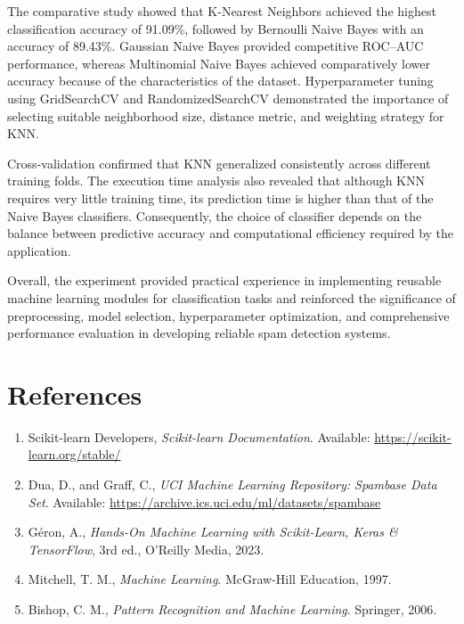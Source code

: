 \documentclass[12pt,a4paper]{article}
\begin{document}
	The comparative study showed that K-Nearest Neighbors achieved the highest classification accuracy of 91.09\%, followed by Bernoulli Naive Bayes with an accuracy of 89.43\%. Gaussian Naive Bayes provided competitive ROC--AUC performance, whereas Multinomial Naive Bayes achieved comparatively lower accuracy because of the characteristics of the dataset. Hyperparameter tuning using GridSearchCV and RandomizedSearchCV demonstrated the importance of selecting suitable neighborhood size, distance metric, and weighting strategy for KNN.
	
	Cross-validation confirmed that KNN generalized consistently across different training folds. The execution time analysis also revealed that although KNN requires very little training time, its prediction time is higher than that of the Naive Bayes classifiers. Consequently, the choice of classifier depends on the balance between predictive accuracy and computational efficiency required by the application.
	
	Overall, the experiment provided practical experience in implementing reusable machine learning modules for classification tasks and reinforced the significance of preprocessing, model selection, hyperparameter optimization, and comprehensive performance evaluation in developing reliable spam detection systems.
	
	\section{References}
	
	\begin{enumerate}
		
		\item Scikit-learn Developers, \emph{Scikit-learn Documentation}. Available: \url{https://scikit-learn.org/stable/}
		
		\item Dua, D., and Graff, C., \emph{UCI Machine Learning Repository: Spambase Data Set}. Available: \url{https://archive.ics.uci.edu/ml/datasets/spambase}
		
		\item Géron, A., \emph{Hands-On Machine Learning with Scikit-Learn, Keras \& TensorFlow}, 3rd ed., O'Reilly Media, 2023.
		
		\item Mitchell, T. M., \emph{Machine Learning}. McGraw-Hill Education, 1997.
		
		\item Bishop, C. M., \emph{Pattern Recognition and Machine Learning}. Springer, 2006.
		
	\end{enumerate}
	
\end{document}
